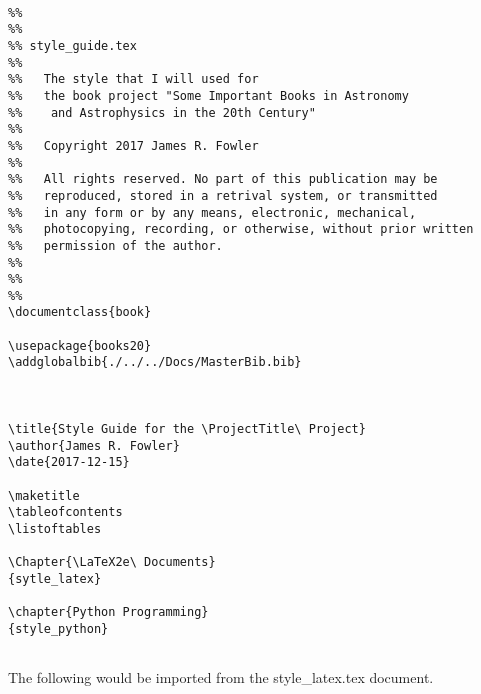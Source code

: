 \begin{verbatim}

%%
%%
%% style_guide.tex
%%
%%   The style that I will used for 
%%   the book project "Some Important Books in Astronomy
%%    and Astrophysics in the 20th Century"
%%
%%   Copyright 2017 James R. Fowler
%%
%%   All rights reserved. No part of this publication may be
%%   reproduced, stored in a retrival system, or transmitted
%%   in any form or by any means, electronic, mechanical,
%%   photocopying, recording, or otherwise, without prior written
%%   permission of the author.
%%
%%
%%
\documentclass{book}

\usepackage{books20}
\addglobalbib{./../../Docs/MasterBib.bib}



\title{Style Guide for the \ProjectTitle\ Project}
\author{James R. Fowler}
\date{2017-12-15}

\maketitle
\tableofcontents
\listoftables 

\Chapter{\LaTeX2e\ Documents}
{sytle_latex}

\chapter{Python Programming}
{style_python}


\end{verbatim}

The following would be imported from  the style\_latex.tex document.


